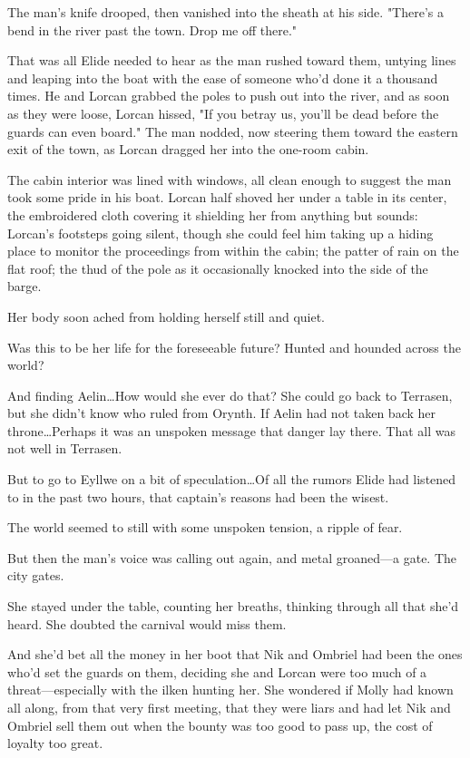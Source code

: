 The man's knife drooped, then vanished into the sheath at his side.
"There's a bend in the river past the town.
Drop me off there."

That was all Elide needed to hear as the man rushed toward them, untying lines and leaping into the boat with the ease of someone who'd done it a thousand times.
He and Lorcan grabbed the poles to push out into the river, and as soon as they were loose, Lorcan hissed, "If you betray us, you'll be dead before the guards can even board."
The man nodded, now steering them toward the eastern exit of the town, as Lorcan dragged her into the one-room cabin.

The cabin interior was lined with windows, all clean enough to suggest the man took some pride in his boat.
Lorcan half shoved her under a table in its center, the embroidered cloth covering it shielding her from anything but sounds: Lorcan's footsteps going silent, though she could feel him taking up a hiding place to monitor the proceedings from within the cabin; the patter of rain on the flat roof; the thud of the pole as it occasionally knocked into the side of the barge.

Her body soon ached from holding herself still and quiet.

Was this to be her life for the foreseeable future?
Hunted and hounded across the world?

And finding Aelin\ldots How would she ever do that?
She could go back to Terrasen, but she didn't know who ruled from Orynth.
If Aelin had not taken back her throne\ldots Perhaps it was an unspoken message that danger lay there.
That all was not well in Terrasen.

But to go to Eyllwe on a bit of speculation\ldots Of all the rumors Elide had listened to in the past two hours, that captain's reasons had been the wisest.

The world seemed to still with some unspoken tension, a ripple of fear.

But then the man's voice was calling out again, and metal groaned---a gate.
The city gates.

She stayed under the table, counting her breaths, thinking through all that she'd heard.
She doubted the carnival would miss them.

And she'd bet all the money in her boot that Nik and Ombriel had been the ones who'd set the guards on them, deciding she and Lorcan were too much of a threat---especially with the ilken hunting her.
She wondered if Molly had known all along, from that very first meeting, that they were liars and had let Nik and Ombriel sell them out when the bounty was too good to pass up, the cost of loyalty too great.

